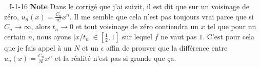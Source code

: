 \begin{corrige}{_I-1-16}
{\bf Note} Dans \href{http://www.bibmath.net/exercices/bde/analyse/distrib/testcor.pdf}{le corrigé} que j'ai suivit, il est dit que sur un voisinage de zéro, $u_n(x)=\frac{ C_n }{ n! }x^n$. Il me semble que cela n'est pas toujours vrai parce que si $C_n\to\infty$, alors $t_n\to 0$ et tout voisinage de zéro contiendra un $x$ tel que pour un certain $n$, nous ayons $|x/t_n|\in [\frac{ 1 }{2},1]$ sur lequel $f$ ne vaut pas $1$. C'est pour cela que je fais appel à un $N$ et un $\epsilon$ affin de prouver que la différence entre $u_n(x)=\frac{ C_n }{ n! }x^n$ et la réalité n'est pas si grande que ça.

\end{corrige}
